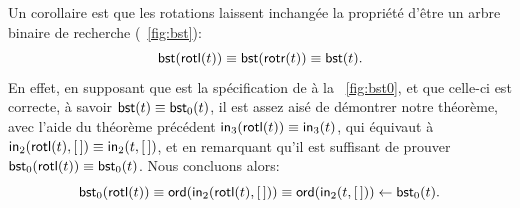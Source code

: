 Un corollaire est que les rotations laissent inchangée la propriété
d'être un arbre binaire de recherche (\fig~\vref{fig:bst}):
\begin{equation*}
\textsf{bst}(\textsf{rotl}(t)) \equiv \textsf{bst}(\textsf{rotr}(t)) \equiv \textsf{bst}(t).
\end{equation*}
En effet, en supposant que  est la spécification de
 à la \fig~\vref{fig:bst0}, et que celle-ci est
correcte, à savoir \(\textsf{bst}(t) \equiv \textsf{bst}_0(t)\), il est
assez aisé de démontrer notre théorème, avec l'aide du théorème
précédent \(\textsf{in}_3(\textsf{rotl}(t)) \equiv \textsf{in}_3(t)\), qui
équivaut à \(\textsf{in}_2(\textsf{rotl}(t),[\,]) \equiv \textsf{in}_2(t,[\,])\),
et en remarquant qu'il est suffisant de prouver
\(\textsf{bst}_0(\textsf{rotl}(t)) \equiv \textsf{bst}_0(t)\). Nous concluons
alors:
\begin{equation*}
\textsf{bst}_0(\textsf{rotl}(t))
\equiv \textsf{ord}(\textsf{in}_2(\textsf{rotl}(t),[\,]))
\equiv \textsf{ord}(\textsf{in}_2(t,[\,]))
\leftarrow \textsf{bst}_0(t).
\end{equation*}

